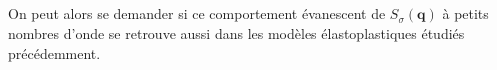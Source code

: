 \subparagraph{}On peut alors se demander si ce comportement évanescent de $S_\sigma(\mathbf{q})$ à petits nombres d'onde se retrouve aussi dans les modèles élastoplastiques étudiés précédemment.

%
%
%
%
%
%
%
